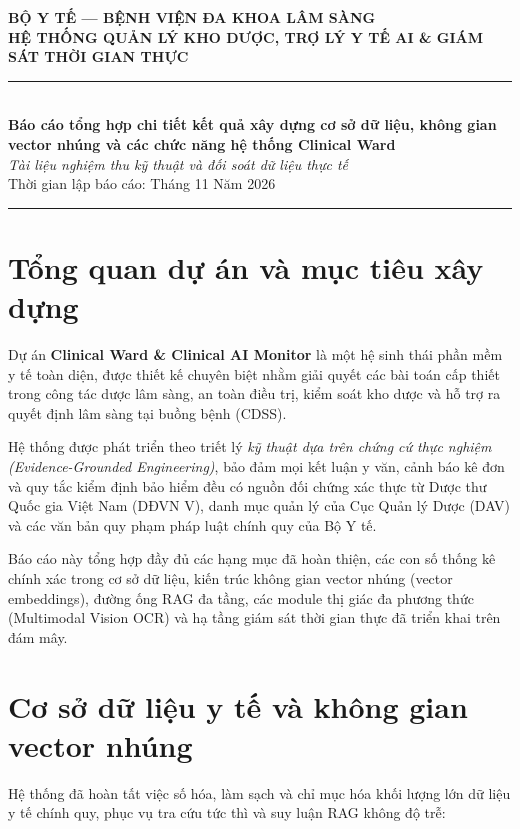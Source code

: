 \documentclass[12pt,a4paper]{article}
\begin{document}
\begin{center}
    {\large \textbf{BỘ Y TẾ --- BỆNH VIỆN ĐA KHOA LÂM SÀNG}}\\[0.3em]
    {\normalsize \textbf{HỆ THỐNG QUẢN LÝ KHO DƯỢC, TRỢ LÝ Y TẾ AI \& GIÁM SÁT THỜI GIAN THỰC}}\\[0.8em]
    \rule{\textwidth}{1.2pt}\\[0.8em]
    {\Large \textbf{Báo cáo tổng hợp chi tiết kết quả xây dựng cơ sở dữ liệu, không gian vector nhúng và các chức năng hệ thống Clinical Ward}}\\[0.5em]
    {\normalsize \textit{Tài liệu nghiệm thu kỹ thuật và đối soát dữ liệu thực tế}}\\[0.3em]
    {\small Thời gian lập báo cáo: Tháng 11 Năm 2026}
\end{center}

\vspace{0.5em}
\rule{\textwidth}{0.4pt}

\section{Tổng quan dự án và mục tiêu xây dựng}

Dự án \textbf{Clinical Ward \& Clinical AI Monitor} là một hệ sinh thái phần mềm y tế toàn diện, được thiết kế chuyên biệt nhằm giải quyết các bài toán cấp thiết trong công tác dược lâm sàng, an toàn điều trị, kiểm soát kho dược và hỗ trợ ra quyết định lâm sàng tại buồng bệnh (CDSS).

Hệ thống được phát triển theo triết lý \textit{kỹ thuật dựa trên chứng cứ thực nghiệm (Evidence-Grounded Engineering)}, bảo đảm mọi kết luận y văn, cảnh báo kê đơn và quy tắc kiểm định bảo hiểm đều có nguồn đối chứng xác thực từ Dược thư Quốc gia Việt Nam (DĐVN V), danh mục quản lý của Cục Quản lý Dược (DAV) và các văn bản quy phạm pháp luật chính quy của Bộ Y tế.

Báo cáo này tổng hợp đầy đủ các hạng mục đã hoàn thiện, các con số thống kê chính xác trong cơ sở dữ liệu, kiến trúc không gian vector nhúng (vector embeddings), đường ống RAG đa tầng, các module thị giác đa phương thức (Multimodal Vision OCR) và hạ tầng giám sát thời gian thực đã triển khai trên đám mây.

\section{Cơ sở dữ liệu y tế và không gian vector nhúng}

Hệ thống đã hoàn tất việc số hóa, làm sạch và chỉ mục hóa khối lượng lớn dữ liệu y tế chính quy, phục vụ tra cứu tức thì và suy luận RAG không độ trễ:
\end{document}
